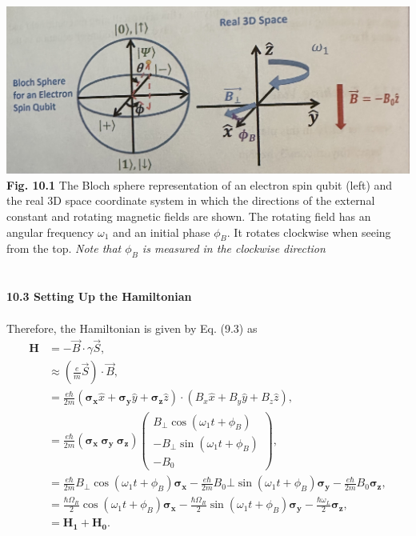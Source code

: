 \documentclass{article}
\begin{document}
\includegraphics[scale=0.45]{Fig.10.1.jpeg}\\
\textbf{Fig. 10.1} The Bloch sphere representation of an electron spin qubit (left) and the real 3D space
coordinate system in which the directions of the external constant and rotating magnetic fields are  shown.
The rotating field has an angular frequency $\omega_1$ and an initial phase $\phi_B$. It rotates clockwise
when seeing from the top. \textit{Note that $\phi_B$ is measured in the clockwise direction}\\\\\\
\textbf{\large 10.3 Setting Up the Hamiltonian}\\\\
Therefore, the Hamiltonian is given by Eq. (9.3) as
\begin{align*}\label{eq 10.3}
    \boldsymbol{H}&=-\vec{B}\cdot\gamma\vec{S},\\
    &\approx(\frac{e}{m}\vec{S})\cdot\vec{B},\\
    &=\frac{e\hbar}{2m}(\boldsymbol{\sigma_x}\hat{x}+\boldsymbol{\sigma_y}\hat{y}+\boldsymbol{\sigma_z}\hat{z})\cdot(B_x\hat{x}+B_y\hat{y}+B_z\hat{z}),\\
    &=\frac{e\hbar}{2m}(\boldsymbol{\sigma_x}\: \boldsymbol{\sigma_y}\: \boldsymbol{\sigma_z})\begin{pmatrix}
        B_\bot\cos(\omega_1t+\phi_B)\\
        -B_\bot\sin(\omega_1t+\phi_B)\\ -B_0
    \end{pmatrix},\\
    &=\frac{e\hbar}{2m}B_\bot\cos(\omega_1t+\phi_B)\boldsymbol{\sigma_x}-\frac{e\hbar}{2m}
        B_0\bot\sin(\omega_1t+\phi_B)\boldsymbol{\sigma_y}-\frac{e\hbar}{2m}B_0\boldsymbol{\sigma_z},\\
        &=\frac{\hbar\varOmega_R}{2}\cos(\omega_1t+\phi_B)\boldsymbol{\sigma_x}-\frac{\hbar\varOmega_R}{2}\sin(\omega_1t+\phi_B)\boldsymbol{\sigma_y}
        -\frac{\hbar\omega_L}{2}\boldsymbol{\sigma_z},\\
        &=\boldsymbol{H_1}+\boldsymbol{H_0}.\tag{10.3}
\end{align*}
\end{document}
